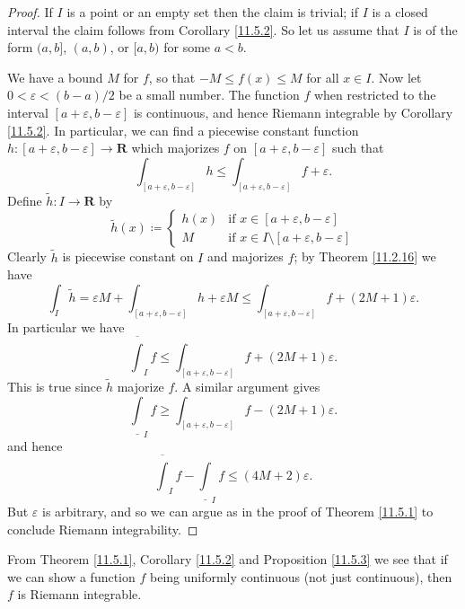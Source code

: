 \begin{proof}
    If \(I\) is a point or an empty set then the claim is trivial;
    if \(I\) is a closed interval the claim follows from Corollary \ref{11.5.2}.
    So let us assume that \(I\) is of the form \((a, b]\), \((a, b)\), or \([a, b)\) for some \(a < b\).

    We have a bound \(M\) for \(f\), so that \(-M \leq f(x) \leq M\) for all \(x \in I\).
    Now let \(0 < \varepsilon < (b - a) / 2\) be a small number.
    The function \(f\) when restricted to the interval \([a + \varepsilon, b - \varepsilon]\) is continuous, and hence Riemann integrable by Corollary \ref{11.5.2}.
    In particular, we can find a piecewise constant function \(h : [a + \varepsilon, b - \varepsilon] \to \mathbf{R}\) which majorizes \(f\) on \([a + \varepsilon, b - \varepsilon]\) such that
    \[
        \int_{[a + \varepsilon, b - \varepsilon]} h \leq \int_{[a + \varepsilon, b - \varepsilon]} f + \varepsilon.
    \]
    Define \(\tilde{h} : I \to \mathbf{R}\) by
    \[
        \tilde{h}(x) \coloneqq \begin{cases}
            h(x) & \text{if } x \in [a + \varepsilon, b - \varepsilon]             \\
            M    & \text{if } x \in I \setminus [a + \varepsilon, b - \varepsilon]
        \end{cases}
    \]
    Clearly \(\tilde{h}\) is piecewise constant on \(I\) and majorizes \(f\);
    by Theorem \ref{11.2.16} we have
    \[
        \int_I \tilde{h} = \varepsilon M + \int_{[a + \varepsilon, b - \varepsilon]} h + \varepsilon M \leq \int_{[a + \varepsilon, b - \varepsilon]} f + (2M + 1) \varepsilon.
    \]
    In particular we have
    \[
        \overline{\int}_I f \leq \int_{[a + \varepsilon, b - \varepsilon]} f + (2M + 1) \varepsilon.
    \]
    This is true since \(\tilde{h}\) majorize \(f\).
    A similar argument gives
    \[
        \underline{\int}_I f \geq \int_{[a + \varepsilon, b - \varepsilon]} f - (2M + 1) \varepsilon.
    \]
    and hence
    \[
        \overline{\int}_I f - \underline{\int}_I f \leq (4M + 2) \varepsilon.
    \]
    But \(\varepsilon\) is arbitrary, and so we can argue as in the proof of Theorem \ref{11.5.1} to conclude Riemann integrability.
\end{proof}

\begin{note}
    From Theorem \ref{11.5.1}, Corollary \ref{11.5.2} and Proposition \ref{11.5.3} we see that if we can show a function \(f\) being uniformly continuous (not just continuous), then \(f\) is Riemann integrable.
\end{note}

